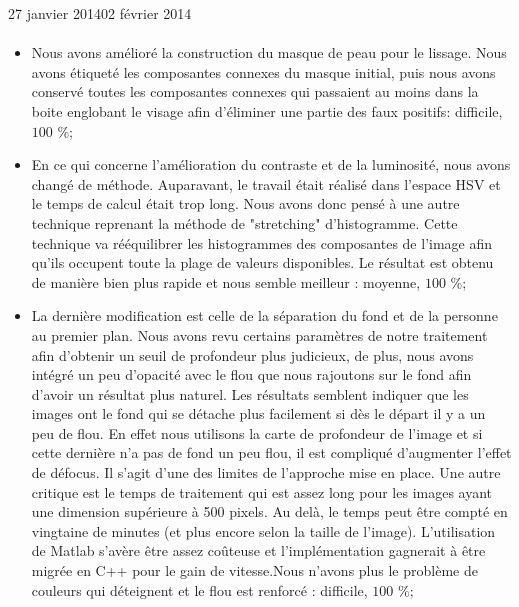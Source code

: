 \documentclass[11pt, french]{report-rd-info}
\begin{document}
\begin{fichesuivi}{27 janvier 2014}{02 février 2014}
\paragraph{}
	\begin{travaileffectue}
		\begin{itemize}
			\item Nous avons amélioré la construction du masque de peau pour le lissage. Nous avons étiqueté les composantes connexes du masque initial, puis nous avons conservé toutes les composantes connexes qui passaient au moins dans la boite englobant le visage afin d'éliminer une partie des faux positifs: difficile, $100$ \%;
			\item En ce qui concerne l'amélioration du contraste et de la luminosité, nous avons changé de méthode. Auparavant, le travail était réalisé dans l'espace HSV et le temps de calcul était trop long. Nous avons donc pensé à une autre technique reprenant la méthode de "stretching" d'histogramme. Cette technique va rééquilibrer les histogrammes des composantes de l'image afin qu'ils occupent toute la plage de valeurs disponibles. Le résultat est obtenu de manière bien plus rapide et nous semble meilleur : moyenne, $100$ \%;
			\item La dernière modification est celle de la séparation du fond et de la personne au premier plan. Nous avons revu certains paramètres de notre traitement afin d'obtenir un seuil de profondeur plus judicieux, de plus, nous avons intégré un peu d'opacité avec le flou que nous rajoutons sur le fond afin d'avoir un résultat plus naturel. Les résultats semblent indiquer que les images ont le fond qui se détache plus facilement si dès le départ il y a un peu de flou. En effet nous utilisons la carte de profondeur de l'image et si cette dernière n'a pas de fond un peu flou, il est compliqué d'augmenter l'effet de défocus. Il s'agit d'une des limites de l'approche mise en place. Une autre critique est le temps de traitement qui est assez long pour les images ayant une dimension supérieure à 500 pixels. Au delà, le temps peut être compté en vingtaine de minutes (et plus encore selon la taille de l'image).
L'utilisation de Matlab s'avère être assez coûteuse et l'implémentation gagnerait à être migrée en C++ pour le gain de vitesse.Nous n'avons plus le problème de couleurs qui déteignent et le flou est renforcé : difficile, $100$ \%;
		\end{itemize}
	\end{travaileffectue}



\end{fichesuivi}
\end{document}

